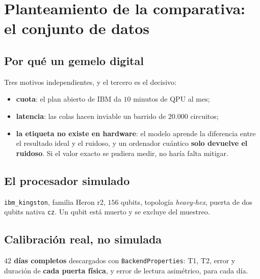 \chapter{Planteamiento de la comparativa: el conjunto de datos}
\label{cap:dataset}



\section{Por qué un gemelo digital}
\label{sec:gemelo}
Tres motivos independientes, y el tercero es el decisivo:
\begin{itemize}
    \item \textbf{cuota}: el plan abierto de IBM da $10$ minutos de QPU al mes;
    \item \textbf{latencia}: las colas hacen inviable un barrido de $20.000$ circuitos;
    \item \textbf{la etiqueta no existe en hardware}: el modelo aprende la diferencia entre el
          resultado ideal y el ruidoso, y un ordenador cuántico \textbf{solo devuelve el
          ruidoso}. Si el valor exacto se pudiera medir, no haría falta mitigar.
\end{itemize}

\section{El procesador simulado}
\label{sec:chip}
\texttt{ibm\_kingston}, familia Heron r2, $156$ qubits, topología \textit{heavy-hex}, puerta de
dos qubits nativa \texttt{cz}. Un qubit está muerto y se excluye del muestreo.

\section{Calibración real, no simulada}
\label{sec:calibracion}
\textbf{$42$ días completos} descargados con \texttt{BackendProperties}: T1, T2, error y duración
de \textbf{cada puerta física}, y error de lectura asimétrico, para cada día.

